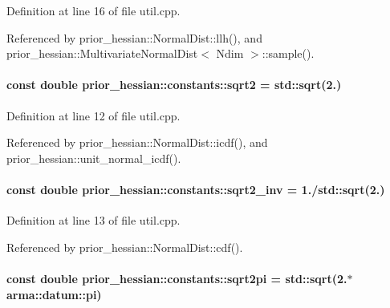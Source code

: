Definition at line 16 of file util.\+cpp.



Referenced by prior\+\_\+hessian\+::\+Normal\+Dist\+::llh(), and prior\+\_\+hessian\+::\+Multivariate\+Normal\+Dist$<$ Ndim $>$\+::sample().

\paragraph[{\texorpdfstring{sqrt2}{sqrt2}}]{\setlength{\rightskip}{0pt plus 5cm}const double prior\+\_\+hessian\+::constants\+::sqrt2 = std\+::sqrt(2.)}\hypertarget{namespaceprior__hessian_1_1constants_aa1b2e54868f0913edd62e8029b829c43}{}\label{namespaceprior__hessian_1_1constants_aa1b2e54868f0913edd62e8029b829c43}


Definition at line 12 of file util.\+cpp.



Referenced by prior\+\_\+hessian\+::\+Normal\+Dist\+::icdf(), and prior\+\_\+hessian\+::unit\+\_\+normal\+\_\+icdf().

\paragraph[{\texorpdfstring{sqrt2\+\_\+inv}{sqrt2_inv}}]{\setlength{\rightskip}{0pt plus 5cm}const double prior\+\_\+hessian\+::constants\+::sqrt2\+\_\+inv = 1./std\+::sqrt(2.)}\hypertarget{namespaceprior__hessian_1_1constants_a083a6193aeb4fb1a3b244a132d25e1e3}{}\label{namespaceprior__hessian_1_1constants_a083a6193aeb4fb1a3b244a132d25e1e3}


Definition at line 13 of file util.\+cpp.



Referenced by prior\+\_\+hessian\+::\+Normal\+Dist\+::cdf().

\paragraph[{\texorpdfstring{sqrt2pi}{sqrt2pi}}]{\setlength{\rightskip}{0pt plus 5cm}const double prior\+\_\+hessian\+::constants\+::sqrt2pi = std\+::sqrt(2.$\ast$arma\+::datum\+::pi)}\hypertarget{namespaceprior__hessian_1_1constants_a575039e0e575a200b1ba202c452ecbad}{}\label{namespaceprior__hessian_1_1constants_a575039e0e575a200b1ba202c452ecbad}


